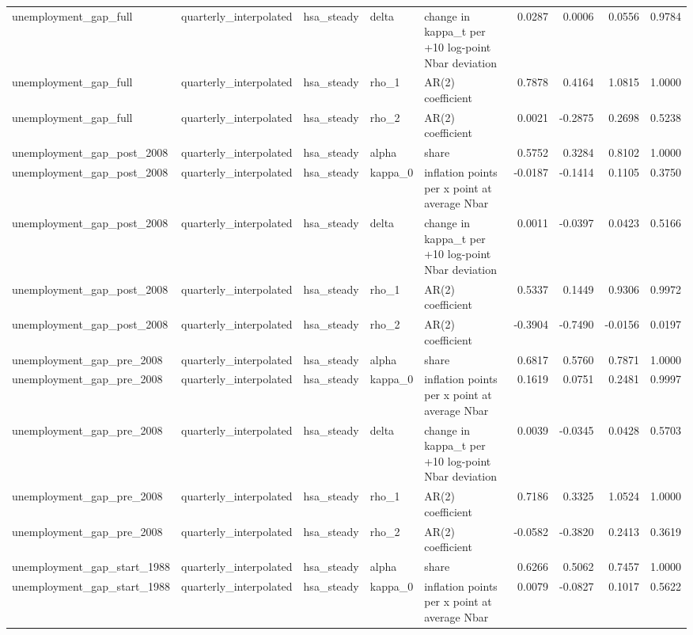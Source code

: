 \begin{tabular}{lllllrrrr}
unemployment\_gap\_full & quarterly\_interpolated & hsa\_steady & delta & change in kappa\_t per +10 log-point Nbar deviation & 0.0287 & 0.0006 & 0.0556 & 0.9784 \\
unemployment\_gap\_full & quarterly\_interpolated & hsa\_steady & rho\_1 & AR(2) coefficient & 0.7878 & 0.4164 & 1.0815 & 1.0000 \\
unemployment\_gap\_full & quarterly\_interpolated & hsa\_steady & rho\_2 & AR(2) coefficient & 0.0021 & -0.2875 & 0.2698 & 0.5238 \\
unemployment\_gap\_post\_2008 & quarterly\_interpolated & hsa\_steady & alpha & share & 0.5752 & 0.3284 & 0.8102 & 1.0000 \\
unemployment\_gap\_post\_2008 & quarterly\_interpolated & hsa\_steady & kappa\_0 & inflation points per x point at average Nbar & -0.0187 & -0.1414 & 0.1105 & 0.3750 \\
unemployment\_gap\_post\_2008 & quarterly\_interpolated & hsa\_steady & delta & change in kappa\_t per +10 log-point Nbar deviation & 0.0011 & -0.0397 & 0.0423 & 0.5166 \\
unemployment\_gap\_post\_2008 & quarterly\_interpolated & hsa\_steady & rho\_1 & AR(2) coefficient & 0.5337 & 0.1449 & 0.9306 & 0.9972 \\
unemployment\_gap\_post\_2008 & quarterly\_interpolated & hsa\_steady & rho\_2 & AR(2) coefficient & -0.3904 & -0.7490 & -0.0156 & 0.0197 \\
unemployment\_gap\_pre\_2008 & quarterly\_interpolated & hsa\_steady & alpha & share & 0.6817 & 0.5760 & 0.7871 & 1.0000 \\
unemployment\_gap\_pre\_2008 & quarterly\_interpolated & hsa\_steady & kappa\_0 & inflation points per x point at average Nbar & 0.1619 & 0.0751 & 0.2481 & 0.9997 \\
unemployment\_gap\_pre\_2008 & quarterly\_interpolated & hsa\_steady & delta & change in kappa\_t per +10 log-point Nbar deviation & 0.0039 & -0.0345 & 0.0428 & 0.5703 \\
unemployment\_gap\_pre\_2008 & quarterly\_interpolated & hsa\_steady & rho\_1 & AR(2) coefficient & 0.7186 & 0.3325 & 1.0524 & 1.0000 \\
unemployment\_gap\_pre\_2008 & quarterly\_interpolated & hsa\_steady & rho\_2 & AR(2) coefficient & -0.0582 & -0.3820 & 0.2413 & 0.3619 \\
unemployment\_gap\_start\_1988 & quarterly\_interpolated & hsa\_steady & alpha & share & 0.6266 & 0.5062 & 0.7457 & 1.0000 \\
unemployment\_gap\_start\_1988 & quarterly\_interpolated & hsa\_steady & kappa\_0 & inflation points per x point at average Nbar & 0.0079 & -0.0827 & 0.1017 & 0.5622 \\

\end{tabular}
